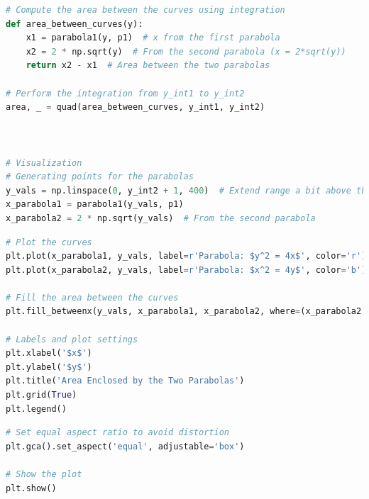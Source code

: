 \documentclass{beamer}
\theoremstyle{remark}
\numberwithin{equation}{section}
\begin{document}
\begin{frame}[fragile]
\begin{lstlisting}[language=Python]
# Compute the area between the curves using integration
def area_between_curves(y):
    x1 = parabola1(y, p1)  # x from the first parabola
    x2 = 2 * np.sqrt(y)  # From the second parabola (x = 2*sqrt(y))
    return x2 - x1  # Area between the two parabolas

# Perform the integration from y_int1 to y_int2
area, _ = quad(area_between_curves, y_int1, y_int2)



# Visualization
# Generating points for the parabolas
y_vals = np.linspace(0, y_int2 + 1, 400)  # Extend range a bit above the highest intersection
x_parabola1 = parabola1(y_vals, p1)
x_parabola2 = 2 * np.sqrt(y_vals)  # From the second parabola
\end{lstlisting}
\end{frame}
\begin{frame}[fragile]
\begin{lstlisting}[language=Python]
# Plot the curves
plt.plot(x_parabola1, y_vals, label=r'Parabola: $y^2 = 4x$', color='r')
plt.plot(x_parabola2, y_vals, label=r'Parabola: $x^2 = 4y$', color='b')

# Fill the area between the curves
plt.fill_betweenx(y_vals, x_parabola1, x_parabola2, where=(x_parabola2 >= x_parabola1), color='lightblue', alpha=0.5)

# Labels and plot settings
plt.xlabel('$x$')
plt.ylabel('$y$')
plt.title('Area Enclosed by the Two Parabolas')
plt.grid(True)
plt.legend()
\end{lstlisting}
\end{frame}
\begin{frame}[fragile]
\begin{lstlisting}[language=Python]
# Set equal aspect ratio to avoid distortion
plt.gca().set_aspect('equal', adjustable='box')

# Show the plot
plt.show()
\end{lstlisting}
\end{frame}
\end{document}
